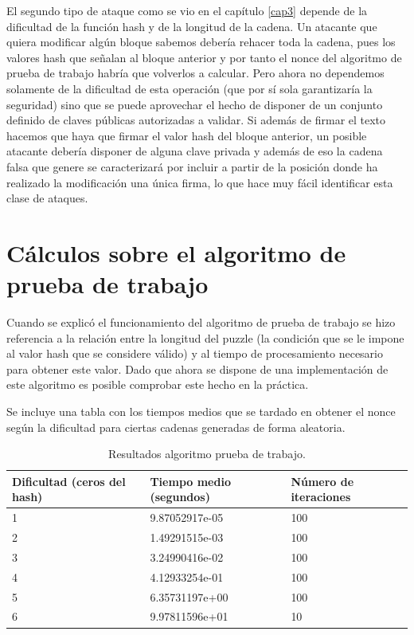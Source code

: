 El segundo tipo de ataque como se vio en el capítulo \ref{cap3} depende de la dificultad de la función hash y de la longitud de la cadena. Un atacante que quiera modificar algún bloque sabemos debería rehacer toda la cadena, pues los valores hash que señalan al bloque anterior y por tanto el nonce del algoritmo de prueba de trabajo habría que volverlos a calcular. Pero ahora no dependemos solamente de la dificultad de esta operación (que por sí sola garantizaría la seguridad) sino que se puede aprovechar el hecho de disponer de un conjunto definido de claves públicas autorizadas a validar. Si además de firmar el texto hacemos que haya que firmar el valor hash del bloque anterior, un posible atacante debería disponer de alguna clave privada y además de eso la cadena falsa que genere se caracterizará por incluir a partir de la posición donde ha realizado la modificación una única firma, lo que hace muy fácil identificar esta clase de ataques.


\section{Cálculos sobre el algoritmo de prueba de trabajo}
Cuando se explicó el funcionamiento del algoritmo de prueba de trabajo se hizo referencia a la relación entre la longitud del puzzle (la condición que se le impone al valor hash que se considere válido) y al tiempo de procesamiento necesario para obtener este valor. Dado que ahora se dispone de una implementación de este algoritmo es posible comprobar este hecho en la práctica.

Se incluye una tabla con los tiempos medios que se tardado en obtener el nonce según la dificultad para ciertas cadenas generadas de forma aleatoria.
\begin{table}[htb]
\centering
\begin{tabular}{|l|l|l|}

\hline
Dificultad (ceros del hash)  & Tiempo medio (segundos) & Número de iteraciones \\
\hline \hline
1 & 9.87052917e-05 & 100\\ \hline
2 & 1.49291515e-03 & 100\\ \hline
3 & 3.24990416e-02 & 100\\ \hline
4 & 4.12933254e-01 & 100\\ \hline
5 & 6.35731197e+00 & 100\\ \hline
6 & 9.97811596e+01 & 10 \\ \hline
\end{tabular}
\caption{Resultados algoritmo prueba de trabajo.}
\label{tabla:anchofijo}
\end{table}

